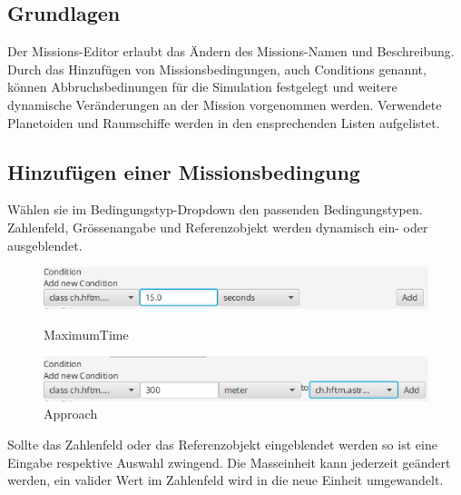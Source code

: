 \subsection{Grundlagen}
Der Missions-Editor erlaubt das Ändern des Missions-Namen und Beschreibung. Durch das Hinzufügen von Missionsbedingungen, auch Conditions genannt, können Abbruchsbedinungen für die Simulation festgelegt und weitere dynamische Veränderungen an der Mission vorgenommen werden. Verwendete Planetoiden und Raumschiffe werden in den ensprechenden Listen aufgelistet.

\hypertarget{addcondition}{\subsection{Hinzufügen einer Missionsbedingung}}
Wählen sie im Bedingungstyp-Dropdown den passenden Bedingungstypen.
Zahlenfeld, Grössenangabe und Referenzobjekt werden dynamisch ein- oder ausgeblendet.

\begin{figure}[H]
	\centering
	\begin{minipage}[b]{0.45\textwidth}
		\includegraphics[width=\textwidth]{res/conditionmaxtime.png}
		\caption{MaximumTime}
	\end{minipage}
	\hfill
	\begin{minipage}[b]{0.45\textwidth}
		\includegraphics[width=\textwidth]{res/conditionapproach.png}
		\caption{Approach}
	\end{minipage}
\end{figure}

Sollte das Zahlenfeld oder das Referenzobjekt eingeblendet werden so ist eine Eingabe respektive Auswahl zwingend.
Die Masseinheit kann jederzeit geändert werden, ein valider Wert im Zahlenfeld wird in die neue Einheit umgewandelt.

